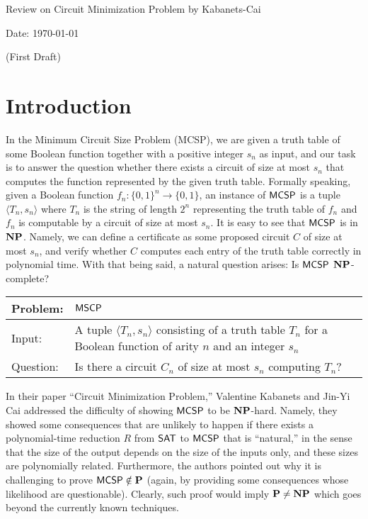 \documentclass[12pt]{article}
\theoremstyle{definition}
\begin{document}
\smallskip
\smallskip
\smallskip

\begin{center}

{\Large Review on Circuit Minimization Problem by Kabanets-Cai}

\bigskip
{\normalsize Date: \today}

\bigskip
{\normalsize (First Draft)}

\end{center}

\section{Introduction}

In the Minimum Circuit Size Problem (MCSP), we are given a truth table of some Boolean function together with a positive integer $s_n$ as input, and our task is to answer the question whether there exists a circuit of size at most $s_n$ that computes the function represented by the given truth table. Formally speaking, given a Boolean function $f_n: \{0, 1\}^n \rightarrow \{0, 1\}$, an instance of $\mathsf{MCSP}$ is a tuple $\langle T_n, s_n \rangle$ where $T_n$ is the string of length $2^n$
representing the truth table of $f_n$ and $f_n$ is computable by a circuit of size at most $s_n$. It is easy to see that $\mathsf{MCSP}$ is in $\mathbf{NP}$. Namely, we can define a certificate as some proposed circuit $C$ of size at most $s_n$, and verify whether $C$ computes each entry of the truth table correctly in polynomial time. With that being said, a natural question arises: Is $\mathsf{MCSP}$  $\mathbf{NP}$-complete?

{
\color{gray}
\renewcommand{\arraystretch}{1.5}
\begin{center}
  \begin{tabular}{|p{2cm}p{11cm}|}
    \hline
    Problem:
    &
    $\mathsf{MSCP}$
    \\
    \hline
    Input:
    &
    A tuple $\langle T_n, s_n \rangle$ consisting of a truth table $T_n$ for
    a Boolean function of arity $n$ and an integer $s_n$
    \\
    Question: & Is there a circuit $C_n$ of size at most $s_n$ computing $T_n$?
    \\
    \hline
  \end{tabular}
\end{center}
}

In their paper ``Circuit Minimization Problem,'' Valentine Kabanets and Jin-Yi Cai addressed the difficulty of showing $\mathsf{MCSP}$ to be $\mathbf{NP}$-hard. Namely, they showed some consequences that are unlikely to happen if there exists a polynomial-time reduction $R$ from $\mathsf{SAT}$ to $\mathsf{MCSP}$ that is ``natural,'' in the sense that the size of the output depends on the size of the inputs only, and these sizes are polynomially related.  Furthermore, the authors pointed out why it is challenging to prove $\mathsf{MCSP} \notin \mathbf{P}$ (again, by providing some consequences whose likelihood are questionable). Clearly, such proof would imply $\mathbf{P} \neq \mathbf{NP}$ which goes beyond the currently known techniques. 
\end{document}
